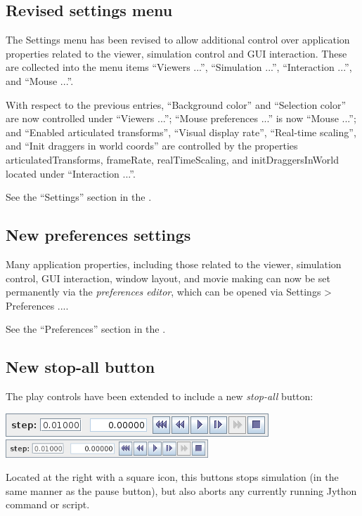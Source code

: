 \documentclass{article}
\begin{document}
\subsection*{Revised settings menu}

The {\sf Settings} menu has been revised to allow additional control
over application properties related to the viewer, simulation control
and GUI interaction. These are collected into the menu items {\sf
``Viewers ...''}, {\sf ``Simulation ...''}, {\sf ``Interaction ...''},
and {\sf ``Mouse ...''}.

With respect to the previous entries, {\sf ``Background color''} and
{\sf ``Selection color''} are now controlled under {\sf ``Viewers
...''}; {\sf ``Mouse preferences ...''} is now {\sf ``Mouse ...''};
and {\sf ``Enabled articulated transforms''}, {\sf ``Visual display
rate''}, {\sf ``Real-time scaling''}, and {\sf ``Init draggers in
world coords''} are controlled by the properties {\sf
articulatedTransforms}, {\sf frameRate}, {\sf realTimeScaling}, and
{\sf initDraggersInWorld} located under {\sf ``Interaction ...''}.

See the ``Settings'' section in the .

\subsection*{New preferences settings}

Many application properties, including those related to the viewer,
simulation control, GUI interaction, window layout, and movie making
can now be set permanently via the {\it preferences editor}, which can
be opened via {\sf Settings > Preferences ...}.

See the ``Preferences'' section in the
.

\subsection*{New stop-all button}

The play controls have been extended to include a new {\it stop-all}
button:
%
\begin{center}
\iflatexml
\includegraphics[]{../uiguide/images/playControls}
\else
\includegraphics[width=3in]{../uiguide/images/playControls}
\fi
\end{center}
%
Located at the right with a square icon, this buttons stops simulation
(in the same manner as the pause button), but also aborts any
currently running Jython command or script.
\end{document}

